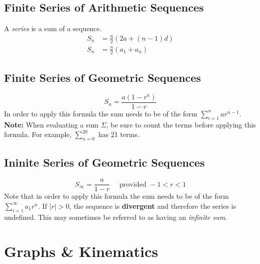 \subsection{Finite Series of Arithmetic Sequences}
A \emph{series} is a sum of a sequence.
\begin{align}
	S_{n} &=\frac{n}{2}(2 a+(n-1) d) \\
	S_{n} &=\frac{n}{2}(a_1 + a_n)
\end{align}

\subsection{Finite Series of Geometric Sequences}
\begin{equation}
	S_{n}=\frac{a\left(1-r^{n}\right)}{1-r}
\end{equation}
In order to apply this formula the sum needs to be of the form \(\sum_{i=1}^n ar^{n-1}\). \textbf{Note:} When evaluating a sum \( \Sigma \), be sure to count the terms before applying this formula. For example, \(\sum_{n=0}^{20}\) has 21 terms.

\subsection{Ininite Series of Geometric Sequences}
\begin{equation}
	S_{\infty}=\frac{a}{1-r} \quad \text { provided }-1<r<1
\end{equation}
Note that in order to apply this formula the sum needs to be of the form \(\sum_{i=1}^\infty a_1r^{n}\). If \(|r| > 0\), the sequence is \textbf{divergent} and therefore the series is undefined. This may sometimes be referred to as having an \emph{infinite sum}.

\section{Graphs \& Kinematics}

